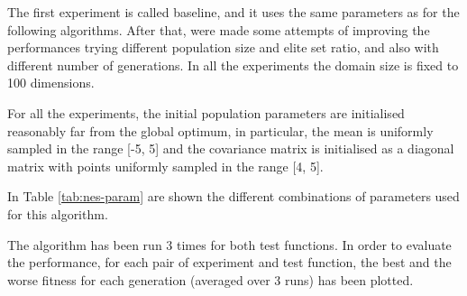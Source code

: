 The first experiment is called baseline, and it uses the same parameters as for the following algorithms. After that, were made some attempts of improving the performances trying different population size and elite set ratio, and also with different number of generations. In all the experiments the domain size is fixed to 100 dimensions.

For all the experiments, the initial population parameters are initialised reasonably far from the global optimum, in particular, the mean is uniformly sampled in the range [-5, 5] and the covariance matrix is initialised as a diagonal matrix with points uniformly sampled in the range [4, 5].

In Table \ref{tab:nes-param} are shown the different combinations of parameters used for this algorithm.
\bigskip

The algorithm has been run 3 times for both test functions. 
In order to evaluate the performance, for each pair of experiment and test function, the best and the worse fitness for each generation (averaged over 3 runs) has been plotted. 
\bigskip

